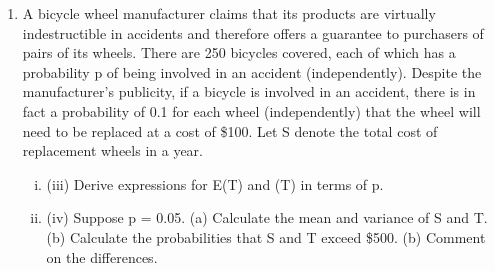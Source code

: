 \documentclass[a4paper,12pt]{article}
\begin{document}
\begin{enumerate}
\item A bicycle wheel manufacturer claims that its products are virtually indestructible in accidents and therefore offers a guarantee to purchasers of pairs of its wheels. There
are 250 bicycles covered, each of which has a probability p of being involved in an accident (independently). Despite the manufacturer’s publicity, if a bicycle is
involved in an accident, there is in fact a probability of 0.1 for each wheel (independently) that the wheel will need to be replaced at a cost of \$100. Let S denote
the total cost of replacement wheels in a year.

\begin{enumerate}[(i)]
\iteM_{S} how that the moment generating function of S is given by
⎡ pe 200 t + 18 pe 100 t + 81 p
⎤
M_{S}  ( t ) = ⎢
+ 1 − p ⎥
100
⎣ ⎢
⎦ ⎥
(ii)
250
.
\iteM_{S} how that $E ( S ) = 5, 000 p$ and $\operatorname{Var}( S ) = 550, 000 p − 100, 000 p^2$
Suppose instead that the manufacturer models the cost of replacement wheels as a random variable T based on a portfolio of 500 wheels, each of which (independently) has a probability of 0.1p of requiring replacement.
\item (iii) Derive expressions for E(T) and (T) in terms of p.
\item (iv) Suppose p = 0.05.
(a) Calculate the mean and variance of S and T.
(b) Calculate the probabilities that S and T exceed \$500.
(b) Comment on the differences.



\end{enumerate}
\end{enumerate}
\end{document}
